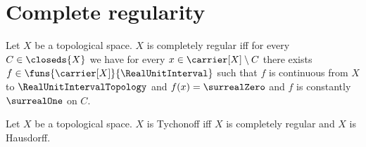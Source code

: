 \section{Complete regularity}








\begin{definition}\label{is_completely_regular}
    Let $X$ be a topological space.
    $X$ is completely regular iff
        for every $C\in\closeds{X}$ we have for every
            $x\in\carrier[X]\setminus C$
        there exists $f\in\funs{\carrier[X]}{\RealUnitInterval}$ such that
            $f$ is continuous from $X$ to $\RealUnitIntervalTopology$ and
            $f(x)=\surrealZero$ and
            $f$ is constantly $\surrealOne$ on $C$.
\end{definition}

\begin{definition}\label{is_tychonoff}
    Let $X$ be a topological space.
    $X$ is Tychonoff iff
        $X$ is completely regular and $X$ is Hausdorff.
\end{definition}

